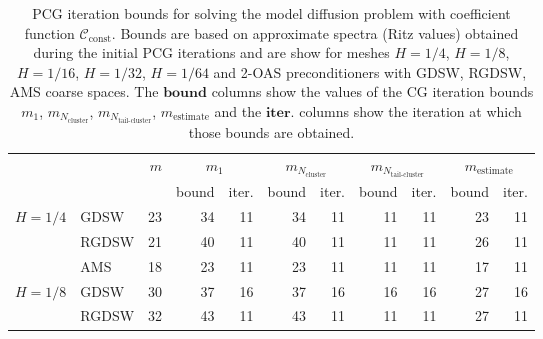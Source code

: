 \begin{table}[H]
\centering
\caption{PCG iteration bounds for solving the model diffusion problem with coefficient function $\mathcal{C}_{\mathrm{const}}$. Bounds are based on approximate spectra (Ritz values) obtained during the initial PCG iterations and are show for meshes $H=1/4$, $H=1/8$, $H=1/16$, $H=1/32$, $H=1/64$ and 2-OAS preconditioners with GDSW, RGDSW, AMS coarse spaces. The $\textbf{bound}$ columns show the values of the CG iteration bounds $m_1$, $m_{N_{\text{cluster}}}$, $m_{N_{\text{tail-cluster}}}$, $m_{\text{estimate}}$ and the $\textbf{iter.}$ columns show the iteration at which those bounds are obtained.}
\label{tab:cg_iteration_bound_coef=const}
\begin{tabular}{llrrrrrrrrr}
\toprule
 &  & \bfseries $m$ & \multicolumn{2}{|c|}{\bfseries $m_1$} & \multicolumn{2}{|c|}{\bfseries $m_{N_{\text{cluster}}}$} & \multicolumn{2}{|c|}{\bfseries $m_{N_{\text{tail-cluster}}}$} & \multicolumn{2}{|c|}{\bfseries $m_{\text{estimate}}$} \\
 &  &  & bound & iter. & bound & iter. & bound & iter. & bound & iter. \\
\midrule
\multirow[c]{3}{*}{\bfseries $H=1/4$} & GDSW & 23 & {\cellcolor[HTML]{91A1F0}} \color[HTML]{F1F1F1} 34 & 11 & {\cellcolor[HTML]{91A1F0}} \color[HTML]{F1F1F1} 34 & 11 & {\cellcolor[HTML]{E2E4FB}} \color[HTML]{000000} 11 & 11 & {\cellcolor[HTML]{405FE5}} \color[HTML]{F1F1F1} 23 & 11 \\
\cline{2-11}
\bfseries  & RGDSW & 21 & {\cellcolor[HTML]{E2E4FB}} \color[HTML]{000000} 40 & 11 & {\cellcolor[HTML]{E2E4FB}} \color[HTML]{000000} 40 & 11 & {\cellcolor[HTML]{91A1F0}} \color[HTML]{F1F1F1} 11 & 11 & {\cellcolor[HTML]{405FE5}} \color[HTML]{F1F1F1} 26 & 11 \\
\cline{2-11}
\bfseries  & AMS & 18 & {\cellcolor[HTML]{91A1F0}} \color[HTML]{F1F1F1} 23 & 11 & {\cellcolor[HTML]{91A1F0}} \color[HTML]{F1F1F1} 23 & 11 & {\cellcolor[HTML]{E2E4FB}} \color[HTML]{000000} 11 & 11 & {\cellcolor[HTML]{405FE5}} \color[HTML]{F1F1F1} 17 & 11 \\
\cline{1-11} \cline{2-11}
\multirow[c]{3}{*}{\bfseries $H=1/8$} & GDSW & 30 & {\cellcolor[HTML]{91A1F0}} \color[HTML]{F1F1F1} 37 & 16 & {\cellcolor[HTML]{91A1F0}} \color[HTML]{F1F1F1} 37 & 16 & {\cellcolor[HTML]{E2E4FB}} \color[HTML]{000000} 16 & 16 & {\cellcolor[HTML]{405FE5}} \color[HTML]{F1F1F1} 27 & 16 \\
\cline{2-11}
\bfseries  & RGDSW & 32 & {\cellcolor[HTML]{91A1F0}} \color[HTML]{F1F1F1} 43 & 11 & {\cellcolor[HTML]{91A1F0}} \color[HTML]{F1F1F1} 43 & 11 & {\cellcolor[HTML]{E2E4FB}} \color[HTML]{000000} 11 & 11 & {\cellcolor[HTML]{405FE5}} \color[HTML]{F1F1F1} 27 & 11 \\

\end{tabular}
\end{table}
